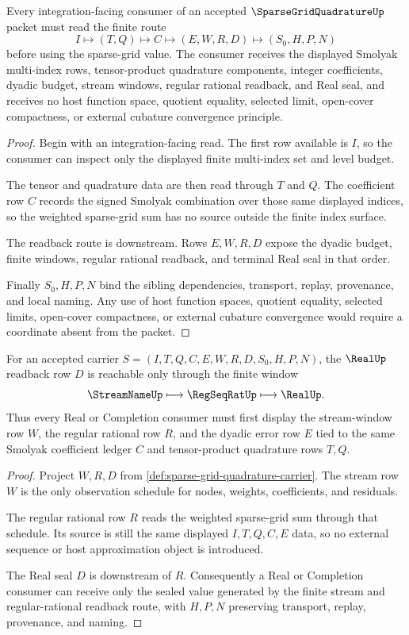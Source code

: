 \begin{theorem}
\label{thm:sparse-grid-quadrature-smolyak-route}
Every integration-facing consumer of an accepted $\SparseGridQuadratureUp$ packet must read the finite route
$$
I \longmapsto (T,Q) \longmapsto C \longmapsto (E,W,R,D) \longmapsto (S_0,H,P,N)
$$
before using the sparse-grid value. The consumer receives the displayed Smolyak multi-index rows, tensor-product quadrature components, integer coefficients, dyadic budget, stream windows, regular rational readback, and Real seal, and receives no host function space, quotient equality, selected limit, open-cover compactness, or external cubature convergence principle.
\end{theorem}
\begin{proof}
Begin with an integration-facing read. The first row available is $I$, so the consumer can inspect only the displayed finite multi-index set and level budget.

The tensor and quadrature data are then read through $T$ and $Q$. The coefficient row $C$ records the signed Smolyak combination over those same displayed indices, so the weighted sparse-grid sum has no source outside the finite index surface.

The readback route is downstream. Rows $E,W,R,D$ expose the dyadic budget, finite windows, regular rational readback, and terminal Real seal in that order.

Finally $S_0,H,P,N$ bind the sibling dependencies, transport, replay, provenance, and local naming. Any use of host function spaces, quotient equality, selected limits, open-cover compactness, or external cubature convergence would require a coordinate absent from the packet.
\end{proof}

\begin{theorem}
\label{thm:sparse-grid-quadrature-real-readback}
For an accepted carrier $S=(I,T,Q,C,E,W,R,D,S_0,H,P,N)$, the $\RealUp$ readback row $D$ is reachable only through the finite window
$$
\StreamNameUp \longmapsto \RegSeqRatUp \longmapsto \RealUp .
$$
Thus every Real or Completion consumer must first display the stream-window row $W$, the regular rational row $R$, and the dyadic error row $E$ tied to the same Smolyak coefficient ledger $C$ and tensor-product quadrature rows $T,Q$.
\end{theorem}
\begin{proof}
Project $W,R,D$ from \autoref{def:sparse-grid-quadrature-carrier}. The stream row $W$ is the only observation schedule for nodes, weights, coefficients, and residuals.

The regular rational row $R$ reads the weighted sparse-grid sum through that schedule. Its source is still the same displayed $I,T,Q,C,E$ data, so no external sequence or host approximation object is introduced.

The Real seal $D$ is downstream of $R$. Consequently a Real or Completion consumer can receive only the sealed value generated by the finite stream and regular-rational readback route, with $H,P,N$ preserving transport, replay, provenance, and naming.
\end{proof}


